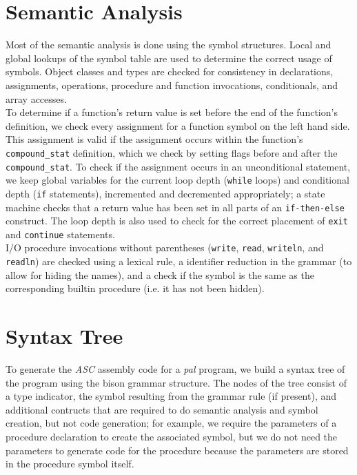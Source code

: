 \documentclass{report}
\begin{document}
\section*{Semantic Analysis}
Most of the semantic analysis is done using the symbol structures. Local and global lookups of the symbol table are used to determine the correct usage of symbols. Object classes and types are checked for consistency in declarations, assignments, operations, procedure and function invocations, conditionals, and array accesses.\\

To determine if a function's return value is set before the end of the function's definition, we check every assignment for a function symbol on the left hand side. This assignment is valid if the assignment occurs within the function's \texttt{compound_stat} definition, which we check by setting flags before and after the \texttt{compound_stat}. To check if the assignment occurs in an unconditional statement, we keep global variables for the current loop depth (\texttt{while} loops) and conditional depth (\texttt{if} statements), incremented and decremented appropriately; a state machine checks that a return value has been set in all parts of an \texttt{if-then-else} construct. The loop depth is also used to check for the correct placement of \texttt{exit} and \texttt{continue} statements.\\

I/O procedure invocations without parentheses (\texttt{write}, \texttt{read}, \texttt{writeln}, and \texttt{readln}) are checked using a lexical rule, a identifier reduction in the grammar (to allow for hiding the names), and a check if the symbol is the same as the corresponding builtin procedure (i.e. it has not been hidden).


\section*{Syntax Tree}
To generate the \emph{ASC} assembly code for a \emph{pal} program, we build a syntax tree of the program using the bison grammar structure. The nodes of the tree consist of a type indicator, the symbol resulting from the grammar rule (if present), and additional contructs that are required to do semantic analysis and symbol creation, but not code generation; for example, we require the parameters of a procedure declaration to create the associated symbol, but we do not need the parameters to generate code for the procedure because the parameters are stored in the procedure symbol itself.\\
\end{document}
